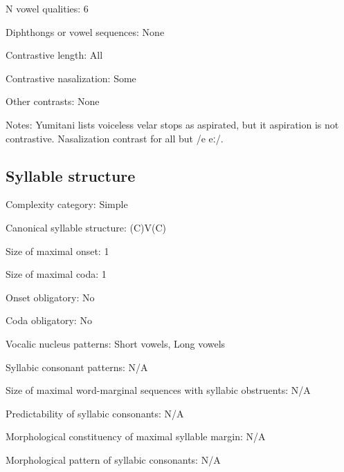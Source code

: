 {\begin{appendixdesc}
\item[N vowel qualities:] 6

\item[Diphthongs or vowel sequences:] None

\item[Contrastive length:] All

\item[Contrastive nasalization:] Some

\item[Other contrasts:] None

\item[Notes:] Yumitani lists voiceless velar stops as aspirated, but it aspiration is not contrastive. Nasalization contrast for all but /e eː/.
\end{appendixdesc}
\subsection*{Syllable structure}
\begin{appendixdesc}

\item[Complexity category:] Simple

\item[Canonical syllable structure:] (C)V(C) \citep[21--22]{Yumitani1998}

\item[Size of maximal onset:] 1

\item[Size of maximal coda:] 1

\item[Onset obligatory:] No

\item[Coda obligatory:] No

\item[Vocalic nucleus patterns:] Short vowels, Long vowels

\item[Syllabic consonant patterns:] N/A

\item[Size of maximal word-marginal sequences with syllabic obstruents:] N/A

\item[Predictability of syllabic consonants:] N/A

\item[Morphological constituency of maximal syllable margin:] N/A

\item[Morphological pattern of syllabic consonants:] N/A


\end{appendixdesc}}
